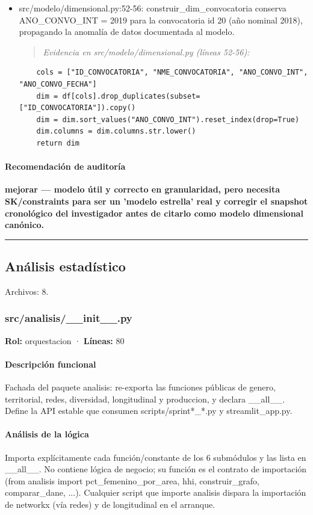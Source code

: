 \begin{tcolorbox}[riesgo]
\begin{itemize}
  \item src/modelo/dimensional.py:52-56: construir\_dim\_convocatoria conserva ANO\_CONVO\_INT = 2019 para la convocatoria id 20 (año nominal 2018), propagando la anomalía de datos documentada al modelo.
\begin{quote}\footnotesize\ttfamily
\noindent\emph{Evidencia en src/modelo/dimensional.py (líneas 52-56):}
\end{quote}
\begin{lstlisting}
    cols = ["ID_CONVOCATORIA", "NME_CONVOCATORIA", "ANO_CONVO_INT", "ANO_CONVO_FECHA"]
    dim = df[cols].drop_duplicates(subset=["ID_CONVOCATORIA"]).copy()
    dim = dim.sort_values("ANO_CONVO_INT").reset_index(drop=True)
    dim.columns = dim.columns.str.lower()
    return dim
\end{lstlisting}

\end{itemize}
\end{tcolorbox}

\paragraph{Recomendación de auditoría}
\textbf{mejorar --- modelo útil y correcto en granularidad, pero necesita SK/constraints para ser un 'modelo estrella' real y corregir el snapshot cronológico del investigador antes de citarlo como modelo dimensional canónico.}

\medskip
\hrule

\subsection{Análisis estadístico}
\noindent Archivos: 8.

\subsubsection{src/analisis/\_\_init\_\_.py}
\textbf{Rol:} orquestacion · \textbf{Líneas:} 80

\paragraph{Descripción funcional}
Fachada del paquete analisis: re-exporta las funciones públicas de genero, territorial, redes, diversidad, longitudinal y produccion, y declara \_\_all\_\_. Define la API estable que consumen scripts/sprint*\_*.py y streamlit\_app.py.

\paragraph{Análisis de la lógica}
Importa explícitamente cada función/constante de los 6 submódulos y las lista en \_\_all\_\_. No contiene lógica de negocio; su función es el contrato de importación (from analisis import pct\_femenino\_por\_area, hhi, construir\_grafo, comparar\_dane, ...). Cualquier script que importe analisis dispara la importación de networkx (vía redes) y de longitudinal en el arranque.

